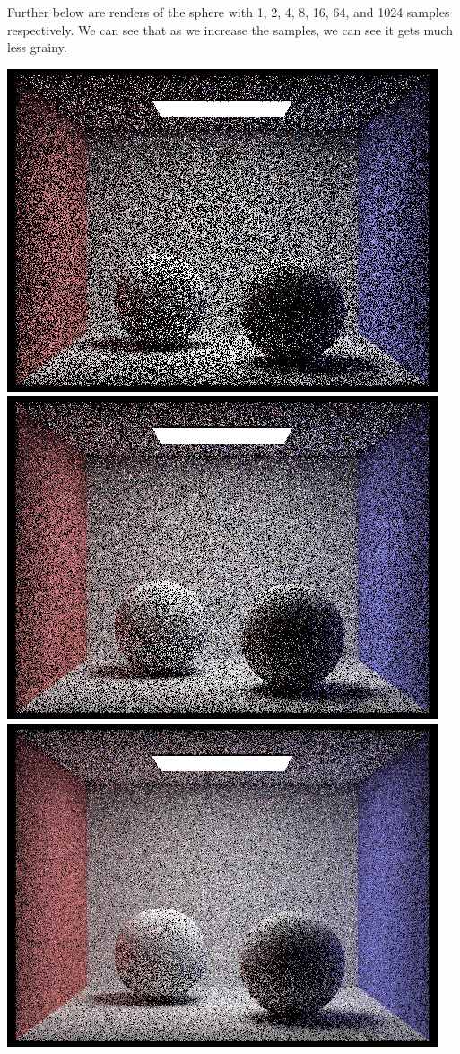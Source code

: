 \documentclass{article}
\begin{document}
Further below are renders of the sphere with 1, 2, 4, 8, 16, 64, and 1024 samples respectively. We can see that as we increase the samples, we can see it gets much less grainy.
\begin{center}
    \includegraphics[width=\textwidth]{task4/spheres_1_4.png}
    \includegraphics[width=\textwidth]{task4/spheres_2_4.png}
    \includegraphics[width=\textwidth]{task4/spheres_4_4.png}

\end{center}
\end{document}
